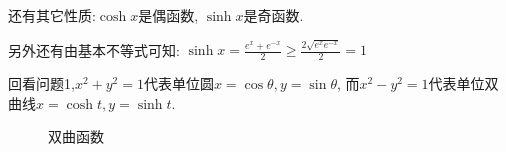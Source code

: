 \documentclass{book}
\begin{document}
    还有其它性质:$\cosh x$是偶函数, $\sinh x$是奇函数. 
        
    另外还有由\textcolor[rgb]{0.75,0.17,0.22}{基本不等式}可知: $\displaystyle \sinh x=\frac{e^x+e^{-x}}{2} \ge \frac{2\sqrt{e^xe^{-x}}}{2}=1$

    \textcolor[rgb]{0.38,0.11,0.2}{回看问题1,$x^2+y^2=1$代表单位圆$x=\cos \theta, y=\sin \theta$, 而$x^2-y^2=1$代表单位双曲线$x=\cosh t, y=\sinh t$.}
    
    \begin{figure}[htbp]    %
          \centering            %
          \caption{双曲函数}    %
          \label{fig:subfig_1}            %
        \end{figure}
\end{document}
